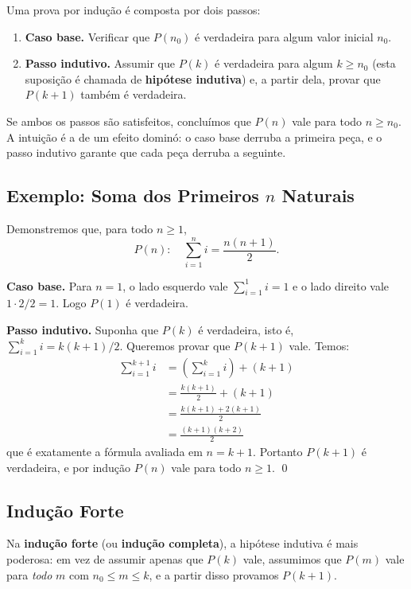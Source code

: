 \documentclass[9pt,a4paper]{extarticle}
\begin{document}
Uma prova por indução é composta por dois passos:

\begin{enumerate}
    \item \textbf{Caso base.} Verificar que $P(n_0)$ é verdadeira para algum valor inicial $n_0$.
    \item \textbf{Passo indutivo.} Assumir que $P(k)$ é verdadeira para algum $k \geq n_0$ (esta suposição é chamada de \textbf{hipótese indutiva}) e, a partir dela, provar que $P(k+1)$ também é verdadeira.
\end{enumerate}

\noindent Se ambos os passos são satisfeitos, concluímos que $P(n)$ vale para todo $n \geq n_0$. A intuição é a de um efeito dominó: o caso base derruba a primeira peça, e o passo indutivo garante que cada peça derruba a seguinte.

\subsection{Exemplo: Soma dos Primeiros $n$ Naturais}

Demonstremos que, para todo $n \geq 1$,
%
\[
P(n): \quad \sum_{i=1}^{n} i = \frac{n(n+1)}{2}.
\]

\textbf{Caso base.} Para $n = 1$, o lado esquerdo vale $\sum_{i=1}^{1} i = 1$ e o lado direito vale $1 \cdot 2 / 2 = 1$. Logo $P(1)$ é verdadeira.

\textbf{Passo indutivo.} Suponha que $P(k)$ é verdadeira, isto é, $\sum_{i=1}^{k} i = k(k+1)/2$. Queremos provar que $P(k+1)$ vale. Temos:
%
\begin{align*}
\sum_{i=1}^{k+1} i &= \left(\sum_{i=1}^{k} i\right) + (k+1) \\
                    &= \frac{k(k+1)}{2} + (k+1) \\
                    &= \frac{k(k+1) + 2(k+1)}{2} \\
                    &= \frac{(k+1)(k+2)}{2}
\end{align*}
%
\noindent que é exatamente a fórmula avaliada em $n = k+1$. Portanto $P(k+1)$ é verdadeira, e por indução $P(n)$ vale para todo $n \geq 1$. \qed

\subsection{Indução Forte}

Na \textbf{indução forte} (ou \textbf{indução completa}), a hipótese indutiva é mais poderosa: em vez de assumir apenas que $P(k)$ vale, assumimos que $P(m)$ vale para \emph{todo} $m$ com $n_0 \leq m \leq k$, e a partir disso provamos $P(k+1)$.
\end{document}
